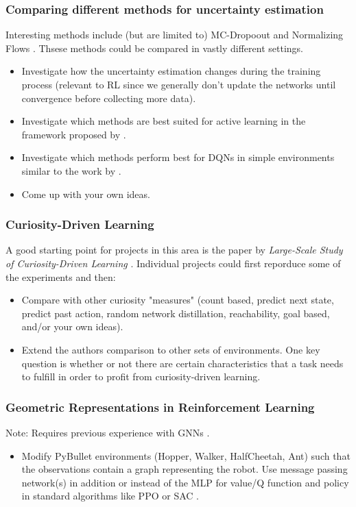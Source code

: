 \documentclass[a4paper]{article}
\begin{document}
\subsubsection{Comparing different methods for uncertainty estimation}
Interesting methods include (but are limited to) MC-Dropoout \cite{Gal2016} and Normalizing Flows \cite{louizos2017multiplicative}. Thsese methods could be compared in vastly different settings.
\begin{itemize}
    \item Investigate how the uncertainty estimation changes during the training process (relevant to RL since we generally don’t update the networks until convergence before collecting more data).
    \item Investigate which methods are best suited for active learning in the framework proposed by \cite{gal2017active}.
    \item Investigate which methods perform best for DQNs in simple environments similar to the work by \cite{touati2018randomized}.
    \item Come up with your own ideas.
\end{itemize}

\subsubsection{Curiosity-Driven Learning}
A good starting point for projects in this area is the paper by \textit{Large-Scale Study of Curiosity-Driven Learning} \cite{burda2018largescale}. Individual projects could first reporduce some of the experiments and then:
\begin{itemize}
    \item Compare with other curiosity "measures" (count based, predict next state, predict past action, random network distillation, reachability, goal based, and/or your own ideas).
    \item Extend the authors comparison to other sets of environments. One key question is whether or not there are certain characteristics that a task needs to fulfill in order to profit from curiosity-driven learning.
\end{itemize}

\subsubsection{Geometric Representations in Reinforcement Learning}
Note: Requires previous experience with GNNs \cite{kipf2016semisupervised}.
\begin{itemize}
    \item Modify PyBullet environments (Hopper, Walker, HalfCheetah, Ant) such that the observations contain a graph representing the robot. Use message passing network(s) in addition or instead of the MLP for value/Q function and policy in standard algorithms like PPO \cite{Schulman2017} or SAC \cite{Haarnoja2018a}.
\end{itemize}




\end{document}
